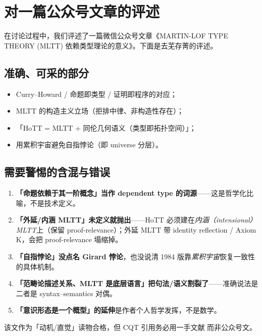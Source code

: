 \documentclass[10pt, openany]{book}
\begin{document}
\chapter{对一篇公众号文章的评述}

在讨论过程中，我们评述了一篇微信公众号文章《MARTIN-LOF TYPE THEORY (MLTT) 依赖类型理论的意义》\cite{JackZhu2026TypeTheory}。下面是去芜存菁的评述。

\section{准确、可采的部分}

\begin{itemize}
  \item Curry--Howard / 命题即类型 / 证明即程序的对应；
  \item MLTT 的构造主义立场（拒排中律、非构造性存在）；
  \item 「HoTT = MLTT + 同伦几何语义（类型即拓扑空间）」；
  \item 用累积宇宙避免自指悖论（即 universe 分层）。
\end{itemize}

\section{需要警惕的含混与错误}

\begin{enumerate}
  \item \textbf{「命题依赖于其一阶概念」当作 dependent type 的词源}——这是哲学化比喻，不是技术定义。
  \item \textbf{「外延/内涵 MLTT」未定义就抛出}——HoTT 必须建在\emph{内涵（intensional）MLTT}上（保留 proof-relevance）；外延 MLTT 带 identity reflection / Axiom K，会把 proof-relevance 塌缩掉。
  \item \textbf{「自指悖论」没点名 Girard 悖论}，也没说清 1984 版靠\emph{累积宇宙}恢复一致性的具体机制。
  \item \textbf{「范畴论描述关系、MLTT 是底层语言」把句法/语义割裂了}——准确说法是二者是 syntax--semantics 对偶。
  \item \textbf{「意识形态是一个概型」的延伸}是作者个人哲学发挥，不是数学。
\end{enumerate}

\begin{principle}[对科普读物的使用纪律]
  该文作为「动机/直觉」读物合格，但 CQT 引用务必用一手文献 \cite{MartinLof1984ITT} 而非公众号文。
\end{principle}
\end{document}
